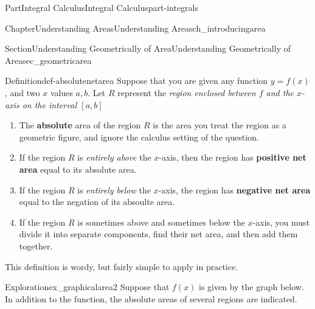 \documentclass{tufte-book}
\newcommand{\terminology}[1]{\textbf{#1}}
\numberwithin{equation}{chapter}
\begin{document}
\begin{partptx}{Part}{Integral Calculus}{}{Integral Calculus}{}{}{part-integrals}
\begin{chapterptx}{Chapter}{Understanding Areas}{}{Understanding Areas}{}{}{ch_introducingarea}
\begin{sectionptx}{Section}{Understanding Geometrically of Area}{}{Understanding Geometrically of Area}{}{}{sec_geometricarea}
\begin{definition}{Definition}{}{def-absolutenetarea}%
Suppose that you are given any function \(y=f(x)\), and two \(x\) values \(a,b\). Let \(R\) represent the \emph{region enclosed between \(f\) and the \(x\)-axis on the interval \([a,b]\)}%
\begin{enumerate}
\item{}The \terminology{absolute} area of the region \(R\) is the area you treat the region as a geometric figure, and ignore the calculus setting of the question.%
\item{}If the region \(R\) is \emph{entirely above} the \(x\)-axis, then the region has \terminology{positive net area} equal to its absolute area.%
\item{}If the region \(R\) is \emph{entirely below} the \(x\)-axis, the region has \terminology{negative net area} equal to the negation of its absoulte area.%
\item{}If the region \(R\) is sometimes above and sometimes below the \(x\)-axis, you must divide it into separate components, find their net area, and then add them together.%
\end{enumerate}
%
\end{definition}
This definition is wordy, but fairly simple to apply in practice.%
\begin{exploration}{Exploration}{}{ex_graphicalarea2}%
Suppose that \(f(x)\) is given by the graph below. In addition to the function, the absolute areas of several regions are indicated.%
\begin{image}{0.25}{0.5}{0.25}{}%
\end{image}
\end{exploration}
\end{sectionptx}
\end{chapterptx}
\end{partptx}
\end{document}
